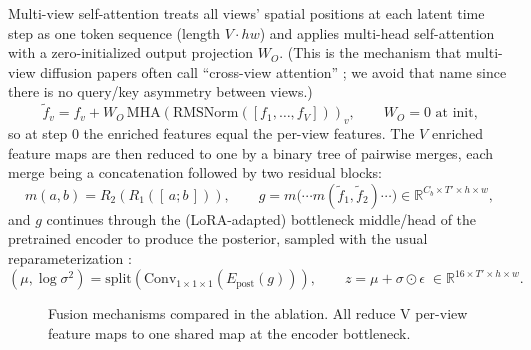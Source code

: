 Multi-view self-attention treats all views' spatial positions at each latent time step as one token sequence (length $V \cdot hw$) and applies multi-head self-attention with a zero-initialized output projection $W_O$. (This is the mechanism that multi-view diffusion papers often call ``cross-view attention'' \cite{shi2023mvdream, gao2024cat3d}; we avoid that name since there is no query/key asymmetry between views.)
\begin{equation}
\tilde{f}_v = f_v + W_O \,\mathrm{MHA}\!\left(\mathrm{RMSNorm}([f_1, \dots, f_V])\right)_v ,
\qquad W_O = 0 \text{ at init,}
\label{eq:fusion_attn}
\end{equation}
so at step 0 the enriched features equal the per-view features. The $V$ enriched feature maps are then reduced to one by a binary tree of pairwise merges, each merge being a concatenation followed by two residual blocks:
\begin{equation}
m(a, b) = R_2\!\left(R_1\!\left([\,a ; b\,]\right)\right),
\qquad
g = m\big(\cdots m(\tilde{f}_1, \tilde{f}_2) \cdots\big) \in \mathbb{R}^{C_b \times T' \times h \times w},
\label{eq:tree_merge}
\end{equation}
and $g$ continues through the (LoRA-adapted) bottleneck middle/head of the pretrained encoder to produce the posterior, sampled with the usual reparameterization \cite{kingma2013auto}:
\begin{equation}
(\mu, \log \sigma^2) = \mathrm{split}\!\left(\mathrm{Conv}_{1\times1\times1}\!\left(E_{\mathrm{post}}(g)\right)\right),
\qquad
z = \mu + \sigma \odot \epsilon \;\in \mathbb{R}^{16 \times T' \times h \times w}.
\end{equation}

\begin{figure}[t]
\centering
{}
\caption{Fusion mechanisms compared in the ablation. All reduce V per-view feature maps to one shared map at the encoder bottleneck.}
\label{fig:fusion}
\end{figure}


